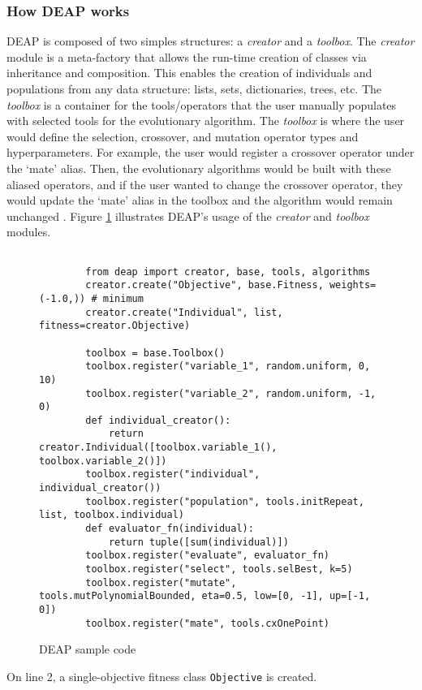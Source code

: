 \subsubsection{How \gls{DEAP} works}
\gls{DEAP} is composed of two simples structures: a \textit{creator} and a 
\textit{toolbox}.  
The \textit{creator} module is a meta-factory that allows the run-time creation 
of classes via inheritance and composition. 
This enables the creation of individuals and populations from any data structure: 
lists, sets, dictionaries, trees, etc. 
The \textit{toolbox} is a container for the tools/operators that the user 
manually populates with selected tools for the evolutionary algorithm.
The \textit{toolbox} is where the user would define the selection, crossover, 
and mutation operator types and hyperparameters. 
For example, the user would register a crossover operator under the `mate'
alias. 
Then, the evolutionary algorithms would be built with these aliased operators, 
and if the user wanted to change the crossover operator, they would update the 
`mate' alias in the toolbox and the algorithm would remain unchanged
\cite{fortin_deap_2012}. 
Figure \ref{fig:deap-code} illustrates DEAP's usage of the \textit{creator} and
\textit{toolbox} modules. 
\begin{figure}[]
    \begin{verbatim}
        
        from deap import creator, base, tools, algorithms
        creator.create("Objective", base.Fitness, weights=(-1.0,)) # minimum
        creator.create("Individual", list, fitness=creator.Objective)

        toolbox = base.Toolbox()
        toolbox.register("variable_1", random.uniform, 0, 10)
        toolbox.register("variable_2", random.uniform, -1, 0)
        def individual_creator():
            return creator.Individual([toolbox.variable_1(), toolbox.variable_2()])
        toolbox.register("individual", individual_creator())
        toolbox.register("population", tools.initRepeat, list, toolbox.individual)
        def evaluator_fn(individual):
            return tuple([sum(individual)])
        toolbox.register("evaluate", evaluator_fn)
        toolbox.register("select", tools.selBest, k=5)
        toolbox.register("mutate", tools.mutPolynomialBounded, eta=0.5, low=[0, -1], up=[-1, 0])
        toolbox.register("mate", tools.cxOnePoint)
    \end{verbatim}
    \caption{DEAP sample code}
    \label{fig:deap-code}
\end{figure}
On line 2, a single-objective fitness class \texttt{Objective} is created. 

